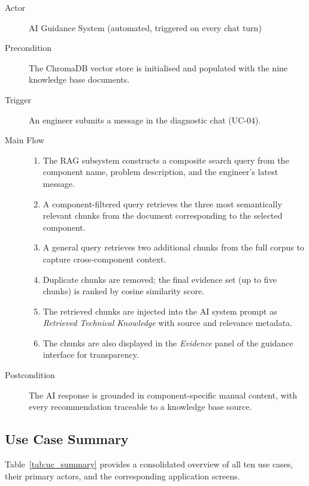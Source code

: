 \begin{description}
    \item[Actor] AI Guidance System (automated, triggered on every chat turn)
    \item[Precondition] The ChromaDB vector store is initialised and populated with
                        the nine knowledge base documents.
    \item[Trigger] An engineer submits a message in the diagnostic chat (UC-04).
    \item[Main Flow]
        \begin{enumerate}[noitemsep]
            \item The RAG subsystem constructs a composite search query from the
                  component name, problem description, and the engineer's latest message.
            \item A component-filtered query retrieves the three most semantically
                  relevant chunks from the document corresponding to the selected component.
            \item A general query retrieves two additional chunks from the full corpus
                  to capture cross-component context.
            \item Duplicate chunks are removed; the final evidence set (up to five chunks)
                  is ranked by cosine similarity score.
            \item The retrieved chunks are injected into the AI system prompt as
                  \textit{Retrieved Technical Knowledge} with source and relevance metadata.
            \item The chunks are also displayed in the \textit{Evidence} panel of the
                  guidance interface for transparency.
        \end{enumerate}
    \item[Postcondition]
        The AI response is grounded in component-specific manual content, with every
        recommendation traceable to a knowledge base source.
\end{description}

\subsection{Use Case Summary\label{sec:uc_summary}}

Table~\ref{tab:uc_summary} provides a consolidated overview of all ten use cases,
their primary actors, and the corresponding application screens.


